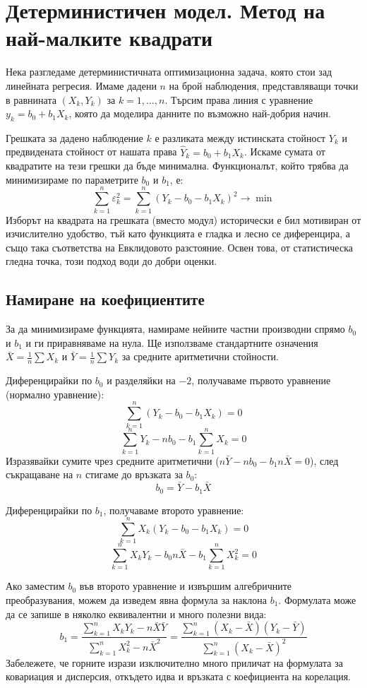 \documentclass{article}
\begin{document}
\section{Детерминистичен модел. Метод на най-малките квадрати}

Нека разгледаме детерминистичната оптимизационна задача, която стои зад линейната регресия. Имаме дадени $n$ на брой наблюдения, представляващи точки в равнината $(X_k, Y_k)$ за $k=1, \dots, n$. Търсим права линия с уравнение $y_k = b_0 + b_1 X_k$, която да моделира данните по възможно най-добрия начин.

Грешката за дадено наблюдение $k$ е разликата между истинската стойност $Y_k$ и предвидената стойност от нашата права $\hat{Y}_k = b_0 + b_1 X_k$. Искаме сумата от квадратите на тези грешки да бъде минимална. Функционалът, който трябва да минимизираме по параметрите $b_0$ и $b_1$, е:
\[
\sum_{k=1}^n \varepsilon_k^2 = \sum_{k=1}^n (Y_k - b_0 - b_1 X_k)^2 \to \min
\]
Изборът на квадрата на грешката (вместо модул) исторически е бил мотивиран от изчислително удобство, тъй като функцията е гладка и лесно се диференцира, а също така съответства на Евклидовото разстояние. Освен това, от статистическа гледна точка, този подход води до добри оценки.

\subsection{Намиране на коефициентите}
За да минимизираме функцията, намираме нейните частни производни спрямо $b_0$ и $b_1$ и ги приравняваме на нула. Ще използваме стандартните означения $\bar{X} = \frac{1}{n}\sum X_k$ и $\bar{Y} = \frac{1}{n}\sum Y_k$ за средните аритметични стойности.

Диференцирайки по $b_0$ и разделяйки на $-2$, получаваме първото уравнение (нормално уравнение):
\[
\sum_{k=1}^n (Y_k - b_0 - b_1 X_k) = 0
\]
\[
\sum_{k=1}^n Y_k - n b_0 - b_1 \sum_{k=1}^n X_k = 0
\]
Изразявайки сумите чрез средните аритметични ($n \bar{Y} - n b_0 - b_1 n \bar{X} = 0$), след съкращаване на $n$ стигаме до връзката за $b_0$:
\[
b_0 = \bar{Y} - b_1 \bar{X}
\]

Диференцирайки по $b_1$, получаваме второто уравнение:
\[
\sum_{k=1}^n X_k (Y_k - b_0 - b_1 X_k) = 0
\]
\[
\sum_{k=1}^n X_k Y_k - b_0 n \bar{X} - b_1 \sum_{k=1}^n X_k^2 = 0
\]

Ако заместим $b_0$ във второто уравнение и извършим алгебричните преобразувания, можем да изведем явна формула за наклона $b_1$. Формулата може да се запише в няколко еквивалентни и много полезни вида:
\[
b_1 = \frac{\sum_{k=1}^n X_k Y_k - n \bar{X}\bar{Y}}{\sum_{k=1}^n X_k^2 - n \bar{X}^2} = \frac{\sum_{k=1}^n (X_k - \bar{X})(Y_k - \bar{Y})}{\sum_{k=1}^n (X_k - \bar{X})^2}
\]
Забележете, че горните изрази изключително много приличат на формулата за ковариация и дисперсия, откъдето идва и връзката с коефициента на корелация.
\end{document}

